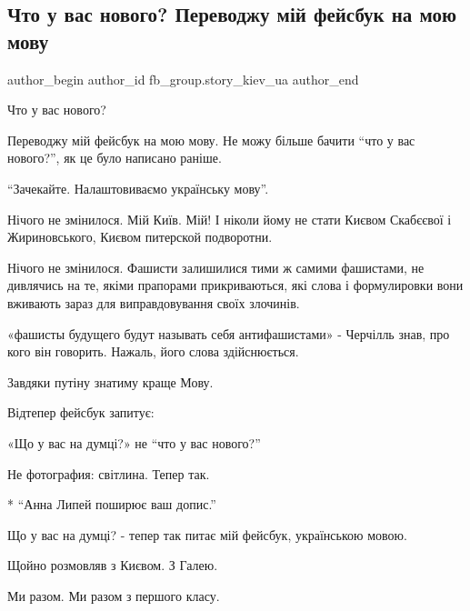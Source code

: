  
 
 
 
 
 
\subsection{Что у вас нового? Переводжу мій фейсбук на мою мову}
\label{sec:26_02_2022.fb.fb_group.story_kiev_ua.2.scho_u_vas_novogo}
 
\ifcmt
 author_begin
   author_id fb_group.story_kiev_ua
 author_end
\fi

Что у вас нового?

Переводжу мій фейсбук на мою мову. Не можу більше бачити \enquote{что у вас нового?},
як це було написано раніше.

\enquote{Зачекайте. Налаштовиваємо українську мову}.

Нічого не змінилося. Мій Київ. Мій! І ніколи йому не стати Києвом Скабєєвої і
Жириновського, Києвом питерской подворотни.

Нічого не змінилося. Фашисти залишилися тими ж самими фашистами, не дивлячись
на те, якіми прапорами прикриваються, які слова і формулировки вони вживають
зараз для виправдовування своїх злочинів. 

«фашисты будущего будут называть себя антифашистами» - Черчілль знав, про кого
він говорить. Нажаль, його слова здійснюється.

Завдяки путіну знатиму краще Мову.

Відтепер фейсбук запитує:

«Що у вас на думці?» не \enquote{что у вас нового?}

Не фотография: світлина. Тепер так.

* \enquote{Анна Липей поширює ваш допис.}

Що у вас на думці? - тепер так питає мій фейсбук, українською мовою.

Щойно розмовляв з Києвом. З Галею.

Ми разом. Ми разом з першого класу.

